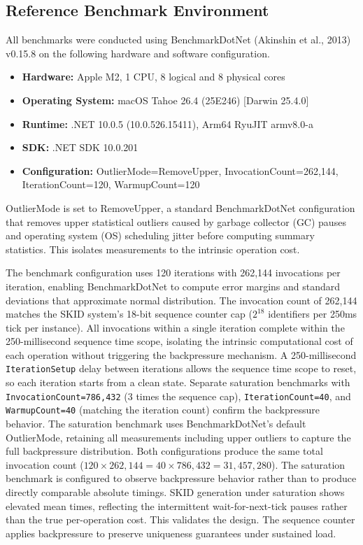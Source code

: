 \documentclass[fleqn,10pt]{wlpeerj}
\providecommand{\tightlist}{%
  \setlength{\itemsep}{0pt}\setlength{\parskip}{0pt}}
\begin{document}
\subsection{Reference Benchmark
Environment}\label{reference-benchmark-environment}

All benchmarks were conducted using BenchmarkDotNet ({Akinshin et al.},
2013) v0.15.8 on the following hardware and software configuration.

\begin{itemize}
\tightlist
\item
  \textbf{Hardware:} Apple M2, 1 CPU, 8 logical and 8 physical cores
\item
  \textbf{Operating System:} macOS Tahoe 26.4 (25E246) {[}Darwin
  25.4.0{]}
\item
  \textbf{Runtime:} .NET 10.0.5 (10.0.526.15411), Arm64 RyuJIT armv8.0-a
\item
  \textbf{SDK:} .NET SDK 10.0.201
\item
  \textbf{Configuration:} OutlierMode=RemoveUpper,
  InvocationCount=262,144, IterationCount=120, WarmupCount=120
\end{itemize}

OutlierMode is set to RemoveUpper, a standard BenchmarkDotNet
configuration that removes upper statistical outliers caused by garbage
collector (GC) pauses and operating system (OS) scheduling jitter before
computing summary statistics. This isolates measurements to the
intrinsic operation cost.

The benchmark configuration uses 120 iterations with 262,144 invocations
per iteration, enabling BenchmarkDotNet to compute error margins and
standard deviations that approximate normal distribution. The invocation
count of 262,144 matches the SKID system's 18-bit sequence counter cap
(\(2^{18}\) identifiers per 250ms tick per instance). All invocations
within a single iteration complete within the 250-millisecond sequence
time scope, isolating the intrinsic computational cost of each operation
without triggering the backpressure mechanism. A 250-millisecond
\texttt{IterationSetup} delay between iterations allows the sequence
time scope to reset, so each iteration starts from a clean state.
Separate saturation benchmarks with \texttt{InvocationCount=786,432} (3
times the sequence cap), \texttt{IterationCount=40}, and
\texttt{WarmupCount=40} (matching the iteration count) confirm the
backpressure behavior. The saturation benchmark uses BenchmarkDotNet's
default OutlierMode, retaining all measurements including upper outliers
to capture the full backpressure distribution. Both configurations
produce the same total invocation count
(\(120 \times 262{,}144 = 40 \times 786{,}432 = 31{,}457{,}280\)). The
saturation benchmark is configured to observe backpressure behavior
rather than to produce directly comparable absolute timings. SKID
generation under saturation shows elevated mean times, reflecting the
intermittent wait-for-next-tick pauses rather than the true
per-operation cost. This validates the design. The sequence counter
applies backpressure to preserve uniqueness guarantees under sustained
load.
\end{document}
